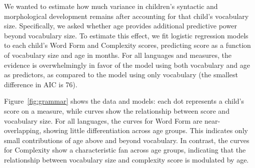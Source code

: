 \documentclass[10pt,letterpaper]{article}
\begin{document}
\begin{figure}
\centering
{}
\end{figure}

We wanted to estimate how much variance in children's syntactic and morphological development remains after accounting for that child's vocabulary size. Specifically, we asked whether age provides additional predictive power beyond vocabulary size. To estimate this effect, we fit logistic regression models to each child's Word Form and Complexity scores, predicting score as a function of vocabulary size and age in months. For all languages and measures, the evidence is overwhelmingly in favor of the model using both vocabulary and age as predictors, as compared to the model using only vocabulary (the smallest difference in AIC is 76). %

Figure~\ref{fig:grammar} shows the data and models: each dot represents a child's score on a measure, while curves show the relationship between score and vocabulary size.
For all languages, the curves for Word Form are near-overlapping, showing little differentiation across age groups. This indicates only small contributions of age above and beyond vocabulary. In contrast, the curves for Complexity show a characteristic fan across age groups, indicating that the relationship between vocabulary size and complexity score is modulated by age. %
\end{document}
